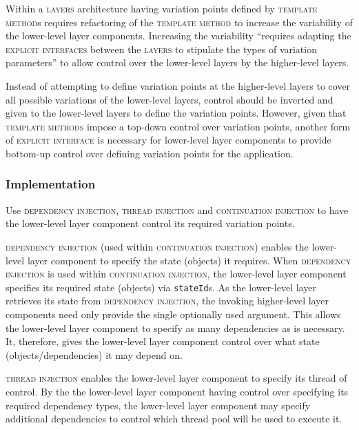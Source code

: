 \documentclass[prodmode]{style/acmlarge}
\begin{document}
Within a \textsc{layers} architecture having variation points defined by
\textsc{template method}s requires refactoring of the \textsc{template method}
to increase the variability of the lower-level layer components.  Increasing the
variability ``requires adapting the \textsc{explicit interfaces} between the
\textsc{layers} to stipulate the types of variation parameters'' \cite[p.
5]{ioc} to allow control over the lower-level layers by the higher-level layers.

Instead of attempting to define variation points at the higher-level layers to cover
all possible variations of the lower-level layers, control should be inverted and
given to the lower-level layers to define the variation points.  However, given
that \textsc{template methods} impose a top-down control over variation points,
another form of \textsc{explicit interface} is necessary for lower-level layer
components to provide bottom-up control over defining variation points for the
application.


\subsubsection*{Implementation}

Use \textsc{dependency injection}, \textsc{thread injection} and
\textsc{continuation injection} to have the lower-level layer component control
its required variation points.

\textsc{dependency injection} \cite{ioc} (used within \textsc{continuation
injection}) enables the lower-level layer component to specify the state
(objects) it requires.  When \textsc{dependency injection} is used within
\textsc{continuation injection}, the lower-level layer component specifies its
required state (objects) via \texttt{stateId}s.  As the lower-level layer
retrieves its state from \textsc{dependency injection}, the invoking
higher-level layer components need only provide the single optionally used
argument.  This allows the lower-level layer component to specify as many
dependencies as is necessary.  It, therefore, gives the lower-level layer component
control over what state (objects/dependencies) it may depend on.

\textsc{thread injection} enables the lower-level layer component to specify its
thread of control.  By the the lower-level layer component having control over
specifying its required dependency types, the lower-level layer component may
specify additional dependencies to control which thread pool will be used to
execute it.
\end{document}
